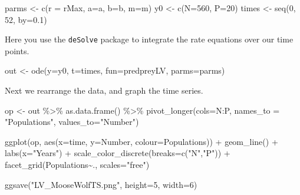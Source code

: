 \documentclass[
  letterpaper,
  DIV=11,
  numbers=noendperiod]{scrreprt}
\newenvironment{Shaded}{\begin{snugshade}}{\end{snugshade}}
\newcommand{\AttributeTok}[1]{\textcolor[rgb]{0.40,0.45,0.13}{#1}}
\newcommand{\DecValTok}[1]{\textcolor[rgb]{0.68,0.00,0.00}{#1}}
\newcommand{\FloatTok}[1]{\textcolor[rgb]{0.68,0.00,0.00}{#1}}
\newcommand{\FunctionTok}[1]{\textcolor[rgb]{0.28,0.35,0.67}{#1}}
\newcommand{\NormalTok}[1]{\textcolor[rgb]{0.00,0.23,0.31}{#1}}
\newcommand{\OtherTok}[1]{\textcolor[rgb]{0.00,0.23,0.31}{#1}}
\newcommand{\SpecialCharTok}[1]{\textcolor[rgb]{0.37,0.37,0.37}{#1}}
\newcommand{\StringTok}[1]{\textcolor[rgb]{0.13,0.47,0.30}{#1}}
\begin{document}
\begin{Shaded}
\begin{Highlighting}[]
\NormalTok{parms }\OtherTok{\textless{}{-}} \FunctionTok{c}\NormalTok{(}\AttributeTok{r =}\NormalTok{ rMax, }\AttributeTok{a=}\NormalTok{a, }\AttributeTok{b=}\NormalTok{b, }\AttributeTok{m=}\NormalTok{m)}
\NormalTok{y0 }\OtherTok{\textless{}{-}} \FunctionTok{c}\NormalTok{(}\AttributeTok{N=}\DecValTok{560}\NormalTok{, }\AttributeTok{P=}\DecValTok{20}\NormalTok{)}
\NormalTok{times }\OtherTok{\textless{}{-}} \FunctionTok{seq}\NormalTok{(}\DecValTok{0}\NormalTok{, }\DecValTok{52}\NormalTok{, }\AttributeTok{by=}\FloatTok{0.1}\NormalTok{)}
\end{Highlighting}
\end{Shaded}

Here you use the \texttt{deSolve} package to integrate the rate
equations over our time points.

\begin{Shaded}
\begin{Highlighting}[]
\NormalTok{out }\OtherTok{\textless{}{-}} \FunctionTok{ode}\NormalTok{(}\AttributeTok{y=}\NormalTok{y0, }\AttributeTok{t=}\NormalTok{times, }\AttributeTok{fun=}\NormalTok{predpreyLV, }\AttributeTok{parms=}\NormalTok{parms)}
\end{Highlighting}
\end{Shaded}

Next we rearrange the data, and graph the time series.

\begin{Shaded}
\begin{Highlighting}[]
\NormalTok{op }\OtherTok{\textless{}{-}}\NormalTok{ out }\SpecialCharTok{\%\textgreater{}\%} \FunctionTok{as.data.frame}\NormalTok{() }\SpecialCharTok{\%\textgreater{}\%}
  \FunctionTok{pivot\_longer}\NormalTok{(}\AttributeTok{cols=}\NormalTok{N}\SpecialCharTok{:}\NormalTok{P, }\AttributeTok{names\_to =} \StringTok{"Populations"}\NormalTok{, }
                   \AttributeTok{values\_to=}\StringTok{"Number"}\NormalTok{)}

\FunctionTok{ggplot}\NormalTok{(op, }\FunctionTok{aes}\NormalTok{(}\AttributeTok{x=}\NormalTok{time, }\AttributeTok{y=}\NormalTok{Number, }\AttributeTok{colour=}\NormalTok{Populations)) }\SpecialCharTok{+} \FunctionTok{geom\_line}\NormalTok{() }\SpecialCharTok{+}
      \FunctionTok{labs}\NormalTok{(}\AttributeTok{x=}\StringTok{"Years"}\NormalTok{) }\SpecialCharTok{+} \FunctionTok{scale\_color\_discrete}\NormalTok{(}\AttributeTok{breaks=}\FunctionTok{c}\NormalTok{(}\StringTok{"N"}\NormalTok{,}\StringTok{"P"}\NormalTok{)) }\SpecialCharTok{+} 
      \FunctionTok{facet\_grid}\NormalTok{(Populations}\SpecialCharTok{\textasciitilde{}}\NormalTok{., }\AttributeTok{scales=}\StringTok{"free"}\NormalTok{)}

\FunctionTok{ggsave}\NormalTok{(}\StringTok{"LV\_MooseWolfTS.png"}\NormalTok{, }\AttributeTok{height=}\DecValTok{5}\NormalTok{, }\AttributeTok{width=}\DecValTok{6}\NormalTok{)}
\end{Highlighting}
\end{Shaded}
\end{document}
